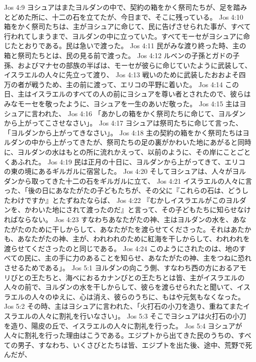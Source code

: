 Jos 4:9  ヨシュアはまたヨルダンの中で、契約の箱をかく祭司たちが、足を踏みとどめた所に、十二の石を立てたが、今日まで、そこに残っている。
Jos 4:10  箱をかく祭司たちは、主がヨシュアに命じて、民に告げさせられた事が、すべて行われてしまうまで、ヨルダンの中に立っていた。すべてモーセがヨシュアに命じたとおりである。民は急いで渡った。
Jos 4:11  民がみな渡り終った時、主の箱と祭司たちとは、民の見る前で渡った。
Jos 4:12  ルベンの子孫とガドの子孫、およびマナセの部族の半ばは、モーセが彼らに命じていたように武装して、イスラエルの人々に先立って渡り、
Jos 4:13  戦いのために武装したおおよそ四万の者が戦うため、主の前に渡って、エリコの平野に着いた。
Jos 4:14  この日、主はイスラエルのすべての人の前にヨシュアを尊い者とされたので、彼らはみなモーセを敬ったように、ヨシュアを一生のあいだ敬った。
Jos 4:15  主はヨシュアに言われた、
Jos 4:16  「あかしの箱をかく祭司たちに命じて、ヨルダンから上がってこさせなさい」。
Jos 4:17  ヨシュアは祭司たちに命じて言った、「ヨルダンから上がってきなさい」。
Jos 4:18  主の契約の箱をかく祭司たちはヨルダンの中から上がってきたが、祭司たちの足の裏がかわいた地にあがると同時に、ヨルダンの水はもとの所に流れかえって、以前のように、その岸にことごとくあふれた。
Jos 4:19  民は正月の十日に、ヨルダンから上がってきて、エリコの東の境にあるギルガルに宿営した。
Jos 4:20  そしてヨシュアは、人々がヨルダンから取ってきた十二の石をギルガルに立て、
Jos 4:21  イスラエルの人々に言った、「後の日にあなたがたの子どもたちが、その父に『これらの石は、どうしたわけですか』とたずねたならば、
Jos 4:22  『むかしイスラエルがこのヨルダンを、かわいた地にされて渡ったのだ』と言って、その子どもたちに知らせなければならない。
Jos 4:23  すなわちあなたがたの神、主はヨルダンの水を、あなたがたのために干しからして、あなたがたを渡らせてくださった。それはあたかも、あなたがたの神、主が、われわれのために紅海を干しからして、われわれを渡らせてくださったのと同じである。
Jos 4:24  このようにされたのは、地のすべての民に、主の手に力のあることを知らせ、あなたがたの神、主をつねに恐れさせるためである」。
Jos 5:1  ヨルダンの向こう側、すなわち西の方におるアモリびとの王たちと、海べにおるカナンびとの王たちとは皆、主がイスラエルの人々の前で、ヨルダンの水を干しからして、彼らを渡らせられたと聞いて、イスラエルの人々のゆえに、心は消え、彼らのうちに、もはや元気もなくなった。
Jos 5:2  その時、主はヨシュアに言われた、「火打石の小刀を造り、重ねてまたイスラエルの人々に割礼を行いなさい」。
Jos 5:3  そこでヨシュアは火打石の小刀を造り、陽皮の丘で、イスラエルの人々に割礼を行った。
Jos 5:4  ヨシュアが人々に割礼を行った理由はこうである。エジプトから出てきた民のうちの、すべての男子、すなわち、いくさびとたちは皆、エジプトを出た後、途中、荒野で死んだが、

